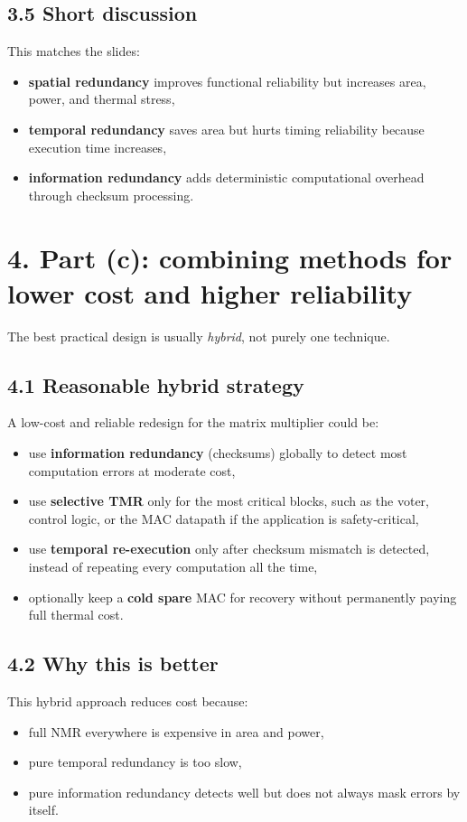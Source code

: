 \documentclass[11pt,a4paper]{article}
\begin{document}
\subsection*{3.5 Short discussion}
This matches the slides:
\begin{itemize}
  \item \textbf{spatial redundancy} improves functional reliability but increases area, power, and thermal stress,
  \item \textbf{temporal redundancy} saves area but hurts timing reliability because execution time increases,
  \item \textbf{information redundancy} adds deterministic computational overhead through checksum processing.
\end{itemize}

\section*{4. Part (c): combining methods for lower cost and higher reliability}
The best practical design is usually \emph{hybrid}, not purely one technique.

\subsection*{4.1 Reasonable hybrid strategy}
A low-cost and reliable redesign for the matrix multiplier could be:
\begin{itemize}
  \item use \textbf{information redundancy} (checksums) globally to detect most computation errors at moderate cost,
  \item use \textbf{selective TMR} only for the most critical blocks, such as the voter, control logic, or the MAC datapath if the application is safety-critical,
  \item use \textbf{temporal re-execution} only after checksum mismatch is detected, instead of repeating every computation all the time,
  \item optionally keep a \textbf{cold spare} MAC for recovery without permanently paying full thermal cost.
\end{itemize}

\subsection*{4.2 Why this is better}
This hybrid approach reduces cost because:
\begin{itemize}
  \item full NMR everywhere is expensive in area and power,
  \item pure temporal redundancy is too slow,
  \item pure information redundancy detects well but does not always mask errors by itself.
\end{itemize}
\end{document}

